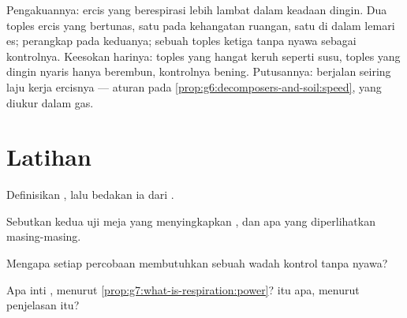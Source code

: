 \begin{example}\label{ex:g7:what-is-respiration:coldseed}
Pengakuannya: ercis yang  berespirasi lebih lambat dalam
keadaan dingin. Dua toples ercis yang bertunas, satu pada kehangatan
ruangan, satu di dalam lemari es; perangkap  pada keduanya;
sebuah toples ketiga tanpa nyawa sebagai kontrolnya. Keesokan harinya:
 toples yang hangat keruh seperti susu,  toples yang
dingin nyaris hanya berembun,  kontrolnya bening. Putusannya:
 berjalan seiring laju kerja ercisnya ---
aturan  pada \cref{prop:g6:decomposers-and-soil:speed}, yang
diukur dalam gas.
\end{example}

\section{Latihan}

\begin{exercise}[$\star$]\label{exo:g7:what-is-respiration:1}
Definisikan , lalu bedakan ia dari .
\end{exercise}

\begin{exercise}[$\star$]\label{exo:g7:what-is-respiration:2}
Sebutkan kedua uji meja yang menyingkapkan , dan apa yang
diperlihatkan masing-masing.
\end{exercise}

\begin{exercise}[$\star$]\label{exo:g7:what-is-respiration:3}
Mengapa setiap percobaan  membutuhkan sebuah wadah kontrol
tanpa nyawa?
\end{exercise}

\begin{exercise}[$\star$]\label{exo:g7:what-is-respiration:4}
Apa inti , menurut
\cref{prop:g7:what-is-respiration:power}?  itu apa,
menurut penjelasan itu?
\end{exercise}

